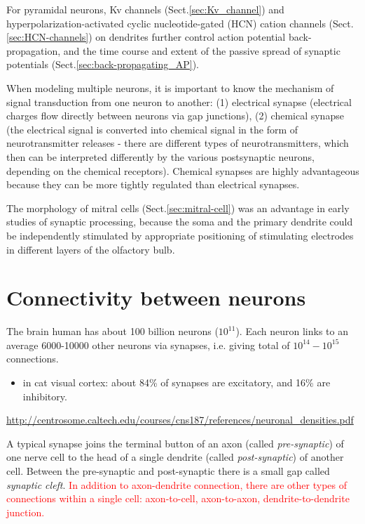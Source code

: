 For pyramidal neurons, Kv channels (Sect.\ref{sec:Kv_channel}) and
hyperpolarization-activated cyclic nucleotide-gated (HCN) cation channels
(Sect.\ref{sec:HCN-channels}) on dendrites further control action potential
back-propagation, and the time course and extent of the passive spread of
synaptic potentials (Sect.\ref{sec:back-propagating_AP}).

When modeling multiple neurons, it is important to know the mechanism of signal
transduction from one neuron to another: (1) electrical synapse (electrical
charges flow directly between neurons via gap junctions), (2) chemical synapse
(the electrical signal is converted into chemical signal in the form of
neurotransmitter releases - there are different types of neurotransmitters,
which then can be interpreted differently by the various postsynaptic neurons,
depending on the chemical receptors). Chemical synapses are highly advantageous
because they can be more tightly regulated than electrical synapses.


The morphology of mitral cells (Sect.\ref{sec:mitral-cell}) was an advantage in
early studies of synaptic processing, because the soma and the primary dendrite
could be independently stimulated by appropriate positioning of stimulating
electrodes in different layers of the olfactory bulb.

\section{Connectivity between neurons}
\label{sec:neuron_connectivities}


The brain human has about 100 billion neurons ($10^{11}$). Each neuron links to 
an average 6000-10000 other neurons via synapses, i.e. giving total of
$10^{14}-10^{15}$ connections. 
\begin{itemize}
  \item in cat visual cortex: about 84\% of synapses are excitatory, and 16\%
  are inhibitory.
\end{itemize}
\url{http://centrosome.caltech.edu/courses/cns187/references/neuronal_densities.pdf}

A typical synapse joins the terminal button of an axon (called {\it
pre-synaptic}) of one nerve cell to the head of a single dendrite (called {\it
post-synaptic}) of another cell.
Between the pre-synaptic and post-synaptic there is a small gap called {\it
synaptic cleft}. \textcolor{red}{In addition to axon-dendrite connection, there
are other types of connections within a single cell: axon-to-cell, axon-to-axon,
dendrite-to-dendrite junction.}

